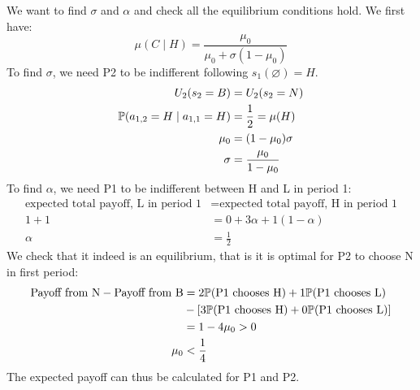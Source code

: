 We want to find $\sigma$ and $\alpha$ and check all the equilibrium conditions hold. We first have:
$$\mu(C \mid H) = \frac{\mu_0}{\mu_0 + \sigma(1-\mu_0)}$$
To find $\sigma$, we need P2 to be indifferent following $s_1(\varnothing) = H$.
\begin{align*}
    U_2(s_2 = B) &= U_2(s_2 = N) \\
    \mathbb{P}(a_{1,2} = H \mid a_{1, 1} = H) &= \frac{1}{2} = \mu(H) \\
    \mu_0 &= (1-\mu_0)\sigma \\
    \sigma &= \frac{\mu_0}{1 - \mu_0}
\end{align*}
To find $\alpha$, we need P1 to be indifferent between H and L in period 1:
\begin{align*}
    \text{expected total payoff, L in period 1} &= \text{expected total payoff, H in period 1} \\
    1 + 1 &= 0 + 3\alpha + 1(1 - \alpha) \\
    \alpha &= \frac{1}{2}
\end{align*}
We check that it indeed is an equilibrium, that is it is optimal for P2 to choose N in first period:
\begin{align*}
    \text{Payoff from N} - \text{Payoff from B} &= 2\mathbb{P}(\text{P1 chooses H}) + 1\mathbb{P}(\text{P1 chooses L}) \\
    &- [3\mathbb{P}(\text{P1 chooses H}) + 0\mathbb{P}(\text{P1 chooses L})] \\
    &= 1 - 4\mu_0 > 0 \\
    \mu_0 &< \frac{1}{4}
\end{align*}
The expected payoff can thus be calculated for P1 and P2.


\newpage